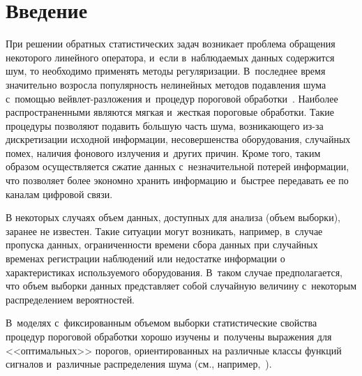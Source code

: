 
  



\thispagestyle{headings}

\begin{multicols}{2}

\label{st\stat}


\section{Введение}

При решении обратных статистических задач возникает проблема обращения 
некоторого линейного оператора, и~если в~наблюдаемых данных содержится шум, 
то необходимо применять методы регуляризации. 
В~последнее время значительно возросла популярность нелинейных методов 
подавления шума с~помощью вейв\-лет-раз\-ло\-же\-ния и~процедур пороговой 
обработки~\cite{D94, AS98}. Наиболее распространенными являются мягкая и~жесткая 
пороговые обработки. Такие процедуры позволяют подавить б$\acute{\mbox{о}}$льшую часть шума,
 возникающего из-за дискретизации исходной информации, несовершенства 
 оборудования, случайных помех, наличия фонового излучения и~других причин. 
 Кроме того, таким образом осуществляется сжатие данных с~незначительной потерей
  информации, что позволяет более экономно хранить информацию и~быстрее 
  передавать ее по каналам цифровой связи.

В некоторых случаях объем данных, доступных для анализа (объем выборки), 
заранее не известен. Такие ситуации могут возникать, например, в~случае 
пропуска данных, ограниченности времени сбора данных при случайных временах 
регистрации наблюдений или недостатке информации о характеристиках используемого
 оборудования. В~таком случае предполагается, что объем выборки данных представляет 
 собой случайную величину с~некоторым распределением вероятностей. 
 
 В~моделях с~фиксированным объемом выборки статистические свойства процедур 
 пороговой обработки хорошо изучены и~получены выражения для <<оптимальных>> 
 порогов, ориентированных на различные классы функций сигналов и~различные 
 распределения шума (см., например,~\cite{DJ94, DJ95, DJ98, Jan01, Jan06, SH17}). 
 

\end{multicols}

